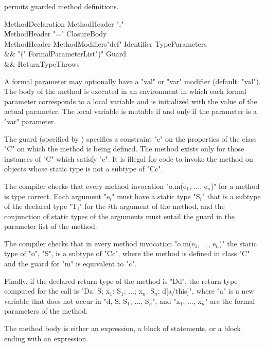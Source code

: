 \Xten{} permits guarded method definitions. 

\begin{grammar}
MethodDeclaration \: MethodHeader \xcd";" \\
                  \| MethodHeader \xcd"=" ClosureBody \\
MethodHeader \:  
  MethodModifiers\opt \xcd"def" Identifier TypeParameters\opt \\
&& \xcd"(" 
  FormalParameterList\opt \xcd")" Guard\opt \\
  && ReturnType\opt Throws\opt \\
\end{grammar}

A formal parameter may optionally have a \xcd"val" or \xcd"var"
modifier (default: \xcd"val").  
The body of the method is executed in an environment in which 
each formal parameter corresponds to a local variable
and is initialized with the value of the actual parameter.
The local variable  is mutable if and only if the
parameter is a \xcd"var" parameter.

\label{MethodGuard}

The guard (specified by )
specifies a constraint \xcd"c" on the
properties of the class \xcd"C" on which the method is being defined. The
method exists only for those instances of \xcd"C" which satisfy \xcd"c".  It is
illegal for code to invoke the method on objects whose static type is
not a subtype of \xcd"C{c}".

\begin{staticrule*}
    The compiler checks that every method invocation
    \xcdmath"o.m(e$_1$, $\dots$, e$_n$)"
    for a method is type correct. Each argument
    \xcdmath"e$_i$" must have a
    static type \xcdmath"S$_i$" that is a subtype of the declared type
    \xcdmath"T$_i$" for the $i$th
    argument of the method, and the conjunction of static types
    of the arguments must entail the guard in the parameter list
    of the method.

    The compiler checks that in every method invocation
    \xcdmath"o.m(e$_1$, $\dots$, e$_n$)"
    the static type of \xcd"o", \xcd"S", is a subtype of \xcd"C{c}", where the method
    is defined in class \xcd"C" and the guard for \xcd"m" is equivalent to
    \xcd"c".

    Finally, if the declared return type of the method is
    \xcd"D{d}", the
    return type computed for the call is
    \xcdmath"D{a: S; x$_1$: S$_1$; $\dots$; x$_n$: S$_n$; d[a/this]}",
    where \xcd"a" is a new
    variable that does not occur in
    \xcdmath"d, S, S$_1$, $\dots$, S$_n$", and
    \xcdmath"x$_1$, $\dots$, x$_n$" are the formal
    parameters of the method.
\end{staticrule*}
The method body is either an expression, a block of statements,
or a block ending with an expression.


